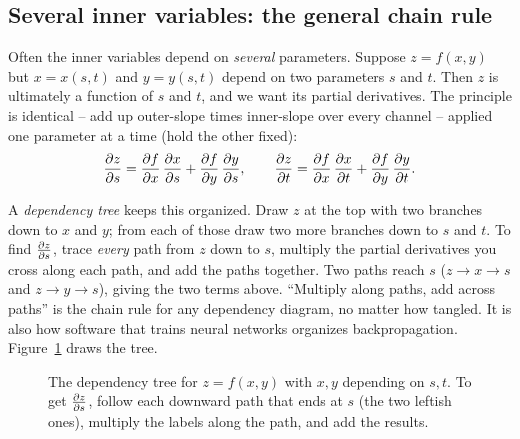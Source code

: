 \subsection{Several inner variables: the general chain rule}

Often the inner variables depend on \emph{several} parameters. Suppose
$z=f(x,y)$ but $x=x(s,t)$ and $y=y(s,t)$ depend on two parameters $s$ and $t$.
Then $z$ is ultimately a function of $s$ and $t$, and we want its partial
derivatives. The principle is identical -- add up outer-slope times inner-slope
over every channel -- applied one parameter at a time (hold the other fixed):
\[
  \frac{\partial z}{\partial s} = \frac{\partial f}{\partial x}\,\frac{\partial x}{\partial s} + \frac{\partial f}{\partial y}\,\frac{\partial y}{\partial s},
  \qquad
  \frac{\partial z}{\partial t} = \frac{\partial f}{\partial x}\,\frac{\partial x}{\partial t} + \frac{\partial f}{\partial y}\,\frac{\partial y}{\partial t}.
\]

\begin{intuitionbox}
A \emph{dependency tree} keeps this organized. Draw $z$ at the top with two
branches down to $x$ and $y$; from each of those draw two more branches down to
$s$ and $t$. To find $\frac{\partial z}{\partial s}$, trace \emph{every} path from $z$ down to $s$,
multiply the partial derivatives you cross along each path, and add the paths
together. Two paths reach $s$ ($z\!\to\!x\!\to\!s$ and $z\!\to\!y\!\to\!s$),
giving the two terms above. ``Multiply along paths, add across paths'' is the
chain rule for any dependency diagram, no matter how tangled. It is also how
software that trains neural networks organizes backpropagation.
Figure~\ref{ch33:fig-tree} draws the tree.
\end{intuitionbox}

\begin{figure}[H]
\centering
{}
\caption{The dependency tree for $z=f(x,y)$ with $x,y$ depending on $s,t$. To get
$\frac{\partial z}{\partial s}$, follow each downward path that ends at $s$ (the two leftish ones),
multiply the labels along the path, and add the results.}
\label{ch33:fig-tree}
\end{figure}

